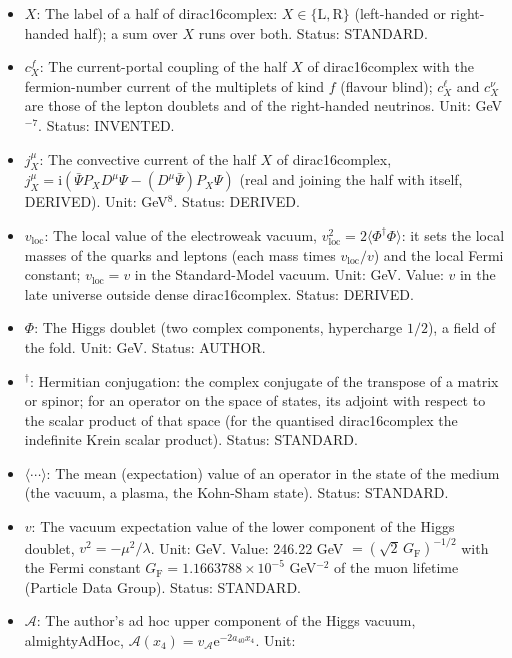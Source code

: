 \documentclass[
  10pt,
]{article}
\begin{document}
\begin{itemize}
\item
  \(X\): The label of a half of dirac16complex:
  \(X \in \{\mathrm{L}, \mathrm{R}\}\) (left-handed or right-handed
  half); a sum over \(X\) runs over both. Status: STANDARD.
\item
  \(c^{f}_X\): The current-portal coupling of the half \(X\) of
  dirac16complex with the fermion-number current of the multiplets of
  kind \(f\) (flavour blind); \(c^{\ell}_X\) and \(c^{\nu}_X\) are those
  of the lepton doublets and of the right-handed neutrinos. Unit:
  GeV\(^{-7}\). Status: INVENTED.
\item
  \(j_X^\mu\): The convective current of the half \(X\) of
  dirac16complex,
  \(j_X^\mu = \mathrm{i}(\bar\Psi P_XD^\mu\Psi - (D^\mu\bar\Psi)P_X\Psi)\)
  (real and joining the half with itself, DERIVED). Unit: GeV\(^8\).
  Status: DERIVED.
\item
  \(v_{\mathrm{loc}}\): The local value of the electroweak vacuum,
  \(v_{\mathrm{loc}}^2 = 2\langle\Phi^\dagger\Phi\rangle\): it sets the
  local masses of the quarks and leptons (each mass times
  \(v_{\mathrm{loc}}/v\)) and the local Fermi constant;
  \(v_{\mathrm{loc}} = v\) in the Standard-Model vacuum. Unit: GeV.
  Value: \(v\) in the late universe outside dense dirac16complex.
  Status: DERIVED.
\item
  \(\Phi\): The Higgs doublet (two complex components, hypercharge
  \(1/2\)), a field of the fold. Unit: GeV. Status: AUTHOR.
\item
  \({}^\dagger\): Hermitian conjugation: the complex conjugate of the
  transpose of a matrix or spinor; for an operator on the space of
  states, its adjoint with respect to the scalar product of that space
  (for the quantised dirac16complex the indefinite Krein scalar
  product). Status: STANDARD.
\item
  \(\langle\cdots\rangle\): The mean (expectation) value of an operator
  in the state of the medium (the vacuum, a plasma, the Kohn-Sham
  state). Status: STANDARD.
\item
  \(v\): The vacuum expectation value of the lower component of the
  Higgs doublet, \(v^2 = -\mu^2/\lambda\). Unit: GeV. Value: 246.22 GeV
  \(= (\sqrt2\,G_{\mathrm{F}})^{-1/2}\) with the Fermi constant
  \(G_{\mathrm{F}} = 1.1663788\times10^{-5}\) GeV\(^{-2}\) of the muon
  lifetime (Particle Data Group). Status: STANDARD.
\item
  \(\mathcal{A}\): The author's ad hoc upper component of the Higgs
  vacuum, almightyAdHoc,
  \(\mathcal{A}(x_4) = v_{\mathcal{A}}\mathrm{e}^{-2a_{40}x_4}\). Unit:

\end{itemize}
\end{document}
